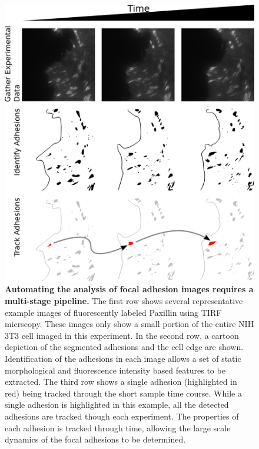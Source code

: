 \begin{figure}[htbp]
\begin{center}
\includegraphics[width=\textwidth]{../figures/FA_workflow/graphic_workflow}
\end{center}
\caption{
{\bf Automating the analysis of focal adhesion images requires a multi-stage pipeline.} The first row shows several representative example images of fluorescently labeled Paxillin using TIRF micrscopy. These images only show a small portion of the entire NIH 3T3 cell imaged in this experiment. In the second row, a cartoon depiction of the segmented adhesions and the cell edge are shown. Identification of the adhesions in each image allows a set of static morphological and fluorescence intensity based features to be extracted. The third row shows a single adhesion (highlighted in red) being tracked through the short sample time course. While a single adhesion is highlighted in this example, all the detected adhesions are tracked though each experiment. The properties of each adhesion is tracked through time, allowing the large scale dynamics of the focal adhesions to be determined.
}
\label{method_flow}
\end{figure}

